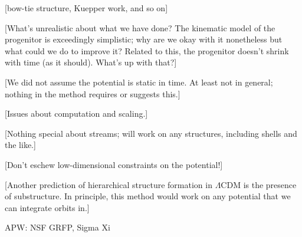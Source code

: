 \documentclass[letterpaper,12pt,preprint]{aastex}
\begin{document}
[bow-tie structure, Kuepper work, and so on]

[What's unrealistic about what we have done?  The kinematic model of
  the progenitor is exceedingly simplistic; why are we okay with it
  nonetheless but what could we do to improve it?  Related to this,
  the progenitor doesn't shrink with time (as it should).  What's up
  with that?]

[We did not assume the potential is static in time.  At least not in
  general; nothing in the method requires or suggests this.]

[Issues about computation and scaling.]

[Nothing special about streams; will work on any structures, including
  shells and the like.]

[Don't eschew low-dimensional constraints on the potential!]

[Another prediction of hierarchical structure formation in $\Lambda$CDM is the presence of substructure. In principle, this method would work on any potential that we can integrate orbits in.]




\acknowledgements
APW: NSF GRFP, Sigma Xi
\end{document}
